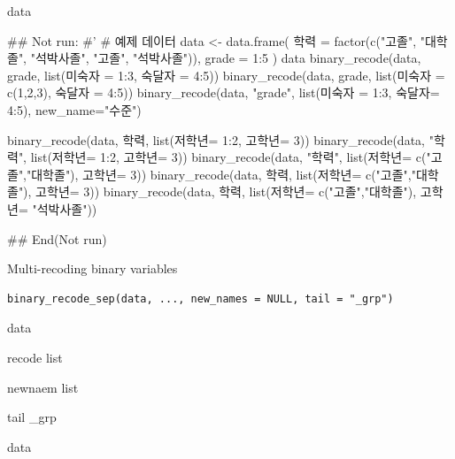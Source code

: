 \documentclass[a4paper]{book}
\begin{document}
%
\begin{Value}
data
\end{Value}
%
\begin{Examples}
\begin{ExampleCode}

## Not run: 
#'
# 예제 데이터
data <- data.frame(
  학력 = factor(c("고졸", "대학졸", "석박사졸", "고졸", "석박사졸")),
  grade = 1:5
)
data
binary_recode(data, grade, list(미숙자 = 1:3, 숙달자 = 4:5))
binary_recode(data, grade, list(미숙자 = c(1,2,3), 숙달자 = 4:5))
binary_recode(data, "grade", list(미숙자 = 1:3, 숙달자= 4:5), new_name="수준")

binary_recode(data, 학력, list(저학년= 1:2, 고학년= 3))
binary_recode(data, "학력", list(저학년= 1:2, 고학년= 3))
binary_recode(data, "학력", list(저학년= c("고졸","대학졸"), 고학년= 3))
binary_recode(data, 학력, list(저학년= c("고졸","대학졸"), 고학년= 3))
binary_recode(data, 학력, list(저학년= c("고졸","대학졸"), 고학년= "석박사졸"))


## End(Not run)

\end{ExampleCode}
\end{Examples}
%
\begin{Description}
Multi-recoding binary variables
\end{Description}
%
\begin{Usage}
\begin{verbatim}
binary_recode_sep(data, ..., new_names = NULL, tail = "_grp")
\end{verbatim}
\end{Usage}
%
\begin{Arguments}
\begin{ldescription}
\item[\code{data}] data

\item[\code{...}] recode list

\item[\code{new\_names}] newnaem list

\item[\code{tail}] tail \_grp
\end{ldescription}
\end{Arguments}
%
\begin{Value}
data
\end{Value}
%
\end{document}
